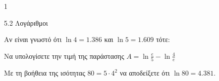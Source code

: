\begin{ylh}{1}
\item 5.2 Λογάριθμοι
\end{ylh}
Αν είναι γνωστό ότι $\ln 4 = 1.386$ και $\ln 5 = 1.609$ τότε:
\begin{alist}
\item Να υπολογίσετε την τιμή της παράστασης $A = \ln \frac{e}{5} - \ln \frac{4}{e}$
\item Με τη βοήθεια της ισότητας $80 = 5 \cdot 4^2$ να αποδείξετε ότι $\ln 80 = 4.381$.
\end{alist}

